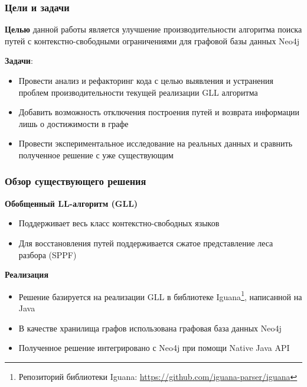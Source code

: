 \documentclass{beamer}
\begin{document}
\begin{frame}
  \transwipe[direction=90]
  \frametitle{Цели и задачи}
  \textbf{Целью} данной работы является улучшение производительности алгоритма поиска путей с контекстно-свободными ограничениями для графовой базы данных Neo4j
  
  \textbf{Задачи}:
  \begin{itemize}
    \item Провести анализ и рефакторинг кода с целью выявления и устранения проблем производительности текущей реализации GLL алгоритма
    \item Добавить возможность отключения построения путей и возврата информации лишь о достижимости в графе
    \item Провести экспериментальное исследование на реальных данных и сравнить полученное решение с уже существующим
\end{itemize}
\end{frame}

\begin{frame}
  \transwipe[direction=90]
  \frametitle{Обзор существующего решения}
  \textbf{Обобщенный LL-алгоритм (GLL)}
\begin{itemize}
    \item Поддерживает весь класс контекстно-свободных языков
    \item Для восстановления путей поддерживается сжатое представление леса разбора (SPPF)
\end{itemize}
\textbf{Реализация}\\
  \begin{itemize}
    \item Решение базируется на реализации GLL в библиотеке Iguana\footnote{ Репозиторий библиотеки Iguana: \url{https://github.com/iguana-parser/iguana}}, написанной на Java
    \item В качестве хранилища графов использована графовая база данных Neo4j
    \item Полученное решение интегрировано с Neo4j при помощи Native Java API
  \end{itemize}
  \end{frame}
\end{document}
